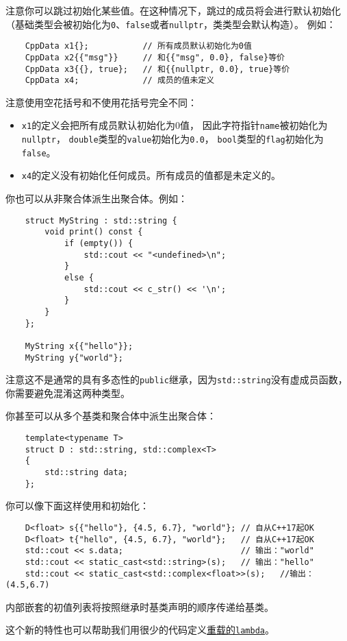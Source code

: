 注意你可以跳过初始化某些值。在这种情况下，跳过的成员将会进行默认初始化
（基础类型会被初始化为\texttt{0}、\texttt{false}或者\texttt{nullptr}，类类型会默认构造）。
例如：
\begin{lstlisting}
    CppData x1{};           // 所有成员默认初始化为0值
    CppData x2{{"msg"}}     // 和{{"msg", 0.0}, false}等价
    CppData x3{{}, true};   // 和{{nullptr, 0.0}, true}等价
    CppData x4;             // 成员的值未定义
\end{lstlisting}
注意使用空花括号和不使用花括号完全不同：
\begin{itemize}
    \item \texttt{x1}的定义会把所有成员默认初始化为0值，
    因此字符指针\texttt{name}被初始化为\texttt{nullptr}，
    \texttt{double}类型的\texttt{value}初始化为\texttt{0.0}，
    \texttt{bool}类型的\texttt{flag}初始化为\texttt{false}。
    \item \texttt{x4}的定义没有初始化任何成员。所有成员的值都是未定义的。
\end{itemize}
你也可以从非聚合体派生出聚合体。例如：
\begin{lstlisting}
    struct MyString : std::string {
        void print() const {
            if (empty()) {
                std::cout << "<undefined>\n";
            }
            else {
                std::cout << c_str() << '\n';
            }
        }
    };

    MyString x{{"hello"}};
    MyString y{"world"};
\end{lstlisting}
注意这不是通常的具有多态性的\texttt{public}继承，因为\texttt{std::string}没有虚成员函数，
你需要避免混淆这两种类型。

你甚至可以从多个基类和聚合体中派生出聚合体：
\begin{lstlisting}
    template<typename T>
    struct D : std::string, std::complex<T>
    {
        std::string data;
    };
\end{lstlisting}
你可以像下面这样使用和初始化：
\begin{lstlisting}
    D<float> s{{"hello"}, {4.5, 6.7}, "world"}; // 自从C++17起OK
    D<float> t{"hello", {4.5, 6.7}, "world"};   // 自从C++17起OK
    std::cout << s.data;                        // 输出："world"
    std::cout << static_cast<std::string>(s);   // 输出："hello"
    std::cout << static_cast<std::complex<float>>(s);   //输出：(4.5,6.7)
\end{lstlisting}
内部嵌套的初值列表将按照继承时基类声明的顺序传递给基类。

这个新的特性也可以帮助我们用很少的代码定义\hyperref[ch14.1]{重载的\texttt{lambda}}。

